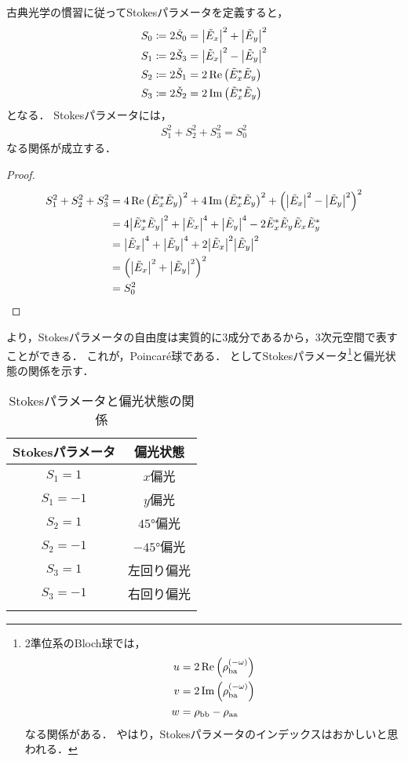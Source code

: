 \documentclass{report}
\begin{document}
    古典光学の慣習に従ってStokesパラメータを定義すると，
    \begin{align}
      S_0 &\coloneqq 2\check{S}_0 = \abs{\tilde{E}_x}^2 + \abs{\tilde{E}_y}^2 \\ 
      S_1 &\coloneqq 2\check{S}_3 = \abs{\tilde{E}_x}^2 - \abs{\tilde{E}_y}^2 \\ 
      S_2 &\coloneqq 2\check{S}_1 = 2\Re\qty(\tilde{E}^*_x\tilde{E}_y) \\ 
      S_3 &\coloneqq 2\check{S}_2 = 2\Im\qty(\tilde{E}^*_x\tilde{E}_y)
    \end{align}
    となる．
    Stokesパラメータには，
    \begin{align}
      S^2_1 + S^2_2 + S^2_3 = S^2_0 \label{stokes-parameter-relation}
    \end{align}
    なる関係が成立する．
    \begin{proof}
      \begin{align}
        S^2_1 + S^2_2 + S^2_3 &= 4\Re\qty(\tilde{E}^*_x\tilde{E}_y)^2 + 4\Im\qty(\tilde{E}^*_x\tilde{E}_y)^2 + \qty(\abs{\tilde{E}_x}^2 - \abs{\tilde{E}_y}^2)^2 \\ 
        &= 4\abs{\tilde{E}^*_x\tilde{E}_y}^2 + \abs{\tilde{E}_x}^4 + \abs{\tilde{E}_y}^4 - 2\tilde{E}^*_x\tilde{E}_y\tilde{E}_x\tilde{E}^*_y \\ 
        &= \abs{\tilde{E}_x}^4 + \abs{\tilde{E}_y}^4 + 2\abs{\tilde{E}_x}^2\abs{\tilde{E}_y}^2 \\ 
        &= \qty(\abs{\tilde{E}_x}^2 + \abs{\tilde{E}_y}^2)^2 \\ 
        &= S^2_0
      \end{align}
    \end{proof}
    より，Stokesパラメータの自由度は実質的に3成分であるから，3次元空間で表すことができる．
    これが，Poincar\'e球である．
    としてStokesパラメータ\footnote{
      2準位系のBloch球では，
      \begin{align}
        u &= 2\Re\qty(\rho^{(-\omega)}_{\mathrm{ba}}) \\ 
        v &= 2\Im\qty(\rho^{(-\omega)}_{\mathrm{ba}}) \\ 
        w &= \rho_{\mathrm{bb}} - \rho_{\mathrm{aa}}
      \end{align}
      なる関係がある．
      やはり，Stokesパラメータのインデックスはおかしいと思われる．
    }と偏光状態の関係を示す．
    \begin{table}[H]
      \centering
      \caption{Stokesパラメータと偏光状態の関係}\label{stokes-parameter-relation-table}
      \begin{tabular}{cc}
        \bhline
        Stokesパラメータ & 偏光状態 \\ \hline
        $S_1 = 1$ & $x$偏光 \\ 
        $S_1 = -1$ & $y$偏光 \\ 
        $S_2 = 1$ & $\ang{45}$偏光 \\ 
        $S_2 = -1$ & $-\ang{45}$偏光 \\ 
        $S_3 = 1$ & 左回り偏光 \\ 
        $S_3 = -1$ & 右回り偏光 \\ \bhline
      \end{tabular}
    \end{table}
\end{document}
